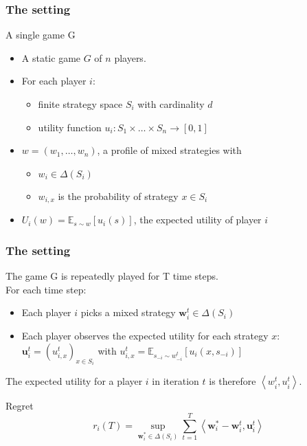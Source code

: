 \documentclass{beamer}
\begin{document}
\begin{frame}
	\frametitle{The setting}
	\begin{block}{A single game G}
	\begin{itemize}
		\item A static game $G$ of $n$ players.
		\item For each player $i$:
		\begin{itemize}
			\item finite strategy space $S_i$ with cardinality $d$
			\item utility function $u_i : S_1 \times \ldots \times S_n \rightarrow [0,1]$
		\end{itemize} \pause
		\item $ w = (w_1 , \ldots, w_n)$, a profile of mixed strategies with
		\begin{itemize}
			\item $w_i \in \Delta(S_i)$
			\item $w_{i,x}$ is the probability of strategy $x \in S_i$
		\end{itemize}
		\item  $U_i(w) = \mathbb{E}_{s\sim{}w}[u_i(s)]$, the expected utility of player $i$
	\end{itemize}
	\end{block}
\end{frame}


\begin{frame}
	\frametitle{The setting}
	The game G is repeatedly played for T time steps.\\
	For each time step:
	\begin{itemize}
		\item Each player $i$ picks a mixed strategy $\mathbf{w}^t_i \in \Delta(S_i)$ 
		\item Each player observes the expected utility for each strategy $x$: $\mathbf{u}^t_i = (u^t_{i,x})_{x \in S_i} $ with $ u^t_{i,x} = \mathbb{E}_{s_{-i} \sim w^t_{-i}} \left[u_i(x,s_{-i})\right] $
	\end{itemize}
	
	The expected utility for a player $i$ in iteration $t$ is therefore 
	$ \left\langle w^t_{i},u^t_{i}\right\rangle $.
	
	\begin{block}{Regret}
		\begin{equation*}
			r_i(T) = \sup\limits_{\mathbf{w}^*_i \in \Delta (S_i)} \sum_{t=1}^{T} \left< \mathbf{w}^*_i - \mathbf{w}^t_i, \mathbf{u}^t_i \right>
		\end{equation*}
	
	\end{block}
	
\end{frame}
\end{document}
